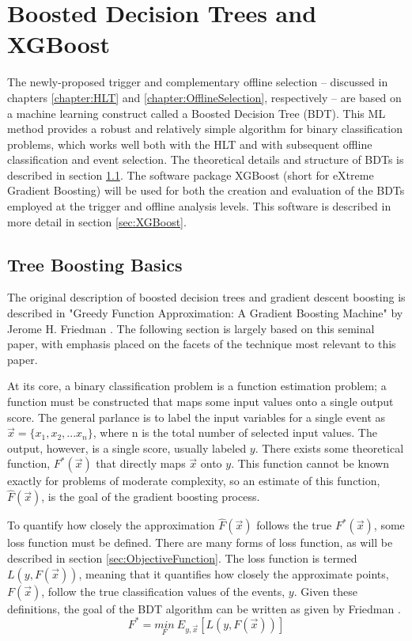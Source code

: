 \documentclass[12pt]{ucsddissertation}
\begin{document}
\chapter{Boosted Decision Trees and XGBoost} \label{chapter:BDTs}
The newly-proposed trigger and complementary offline selection -- discussed in chapters \ref{chapter:HLT} and \ref{chapter:OfflineSelection}, respectively -- are based on a machine learning construct called a Boosted Decision Tree (BDT). This ML method provides a robust and relatively simple algorithm for binary classification problems, which works well both with the HLT and with subsequent offline classification and event selection. The theoretical details and structure of BDTs is described in section \ref{sec:BDTBasics}. The software package XGBoost (short for eXtreme Gradient Boosting) will be used for both the creation and evaluation of the BDTs employed at the trigger and offline analysis levels. This software is described in more detail in section \ref{sec:XGBoost}.
\section{Tree Boosting Basics} \label{sec:BDTBasics}
The original description of boosted decision trees and gradient descent boosting is described in "Greedy Function Approximation: A Gradient Boosting Machine" by Jerome H. Friedman \cite{BDTPaper}. The following section is largely based on this seminal paper, with emphasis placed on the facets of the technique most relevant to this paper. 

At its core, a binary classification problem is a function estimation problem; a function must be constructed that maps some input values onto a single output score. The general parlance is to label the input variables for a single event as $\vec{x} = \{x_1, x_2, ... x_n\}$, where n is the total number of selected input values. The output, however, is a single score, usually labeled $y$. There exists some theoretical function, $F^{*}(\vec{x})$ that directly maps $\vec{x}$ onto $y$. This function cannot be known exactly for problems of moderate complexity, so an estimate of this function, $\hat{F}(\vec{x})$, is the goal of the gradient boosting process. 

To quantify how closely the approximation $\hat{F}(\vec{x})$ follows the true $F^{*}(\vec{x})$, some loss function must be defined. There are many forms of loss function, as will be described in section \ref{sec:ObjectiveFunction}. The loss function is termed $L(y,F(\vec{x}))$, meaning that  it quantifies how closely the approximate points, $F(\vec{x})$, follow the true classification values of the events, $y$. Given these definitions, the goal of the BDT algorithm can be written as given by Friedman \cite{BDTPaper}.
\begin{equation}\label{eqn:FriedmanOverallFunction}
    F^{*} = \underset{F}{min} \: E_{y,\vec{x}}[L(y,F(\vec{x}))]
\end{equation}
\end{document}
